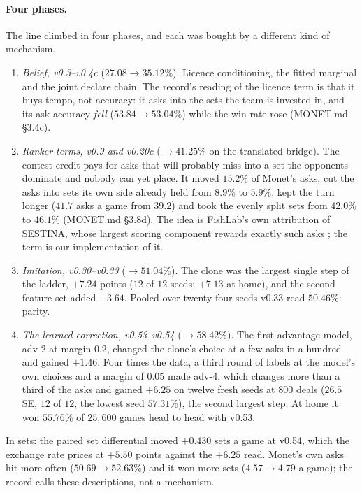 \documentclass[11pt]{article}
\newcommand{\monet}{MONET.md}
\newcommand{\sect}[1]{\S#1}
\begin{document}
\paragraph{Four phases.} The line climbed in four phases, and each was bought by a different kind of
mechanism.
\begin{enumerate}
  \item \emph{Belief, v0.3--v0.4c} ($27.08 \to 35.12\%$). Licence conditioning, the fitted marginal
        and the joint declare chain. The record's reading of the licence term is that it buys tempo,
        not accuracy: it asks into the sets the team is invested in, and its ask accuracy
        \emph{fell} ($53.84 \to 53.04\%$) while the win rate rose (\monet{} \sect{3.4c}).
  \item \emph{Ranker terms, v0.9 and v0.20c} ($\to 41.25\%$ on the translated bridge). The contest
        credit pays for asks that will probably miss into a set the opponents dominate and nobody can
        yet place. It moved $15.2\%$ of Monet's asks, cut the asks into sets its own side already held
        from $8.9\%$ to $5.9\%$, kept the turn longer ($41.7$ asks a game from $39.2$) and took the
        evenly split sets from $42.0\%$ to $46.1\%$ (\monet{} \sect{3.8d}). The idea is FishLab's own
        attribution of SESTINA, whose largest scoring component rewards exactly such asks
        \cite{fishlab}; the term is our implementation of it.
  \item \emph{Imitation, v0.30--v0.33} ($\to 51.04\%$). The clone was the largest single step of the
        ladder, $+7.24$ points ($12$ of $12$ seeds; $+7.13$ at home), and the second feature set added
        $+3.64$. Pooled over twenty-four seeds v0.33 read $50.46\%$: parity.
  \item \emph{The learned correction, v0.53--v0.54} ($\to 58.42\%$). The first advantage model, adv-2
        at margin $0.2$, changed the clone's choice at a few asks in a hundred and gained $+1.46$.
        Four times the data, a third round of labels at the model's own choices and a margin of
        $0.05$ made adv-4, which changes more than a third of the asks and gained $+6.25$ on twelve
        fresh seeds at $800$ deals ($26.5$ SE, $12$ of $12$, the lowest seed $57.31\%$), the second
        largest step. At home it won $55.76\%$ of $25{,}600$ games head to head with v0.53.
\end{enumerate}
In sets: the paired set differential moved $+0.430$ sets a game at v0.54, which the exchange rate
prices at $+5.50$ points against the $+6.25$ read. Monet's own asks hit more often ($50.69 \to 52.63\%$)
and it won more sets ($4.57 \to 4.79$ a game); the record calls these descriptions, not a mechanism.
\end{document}
